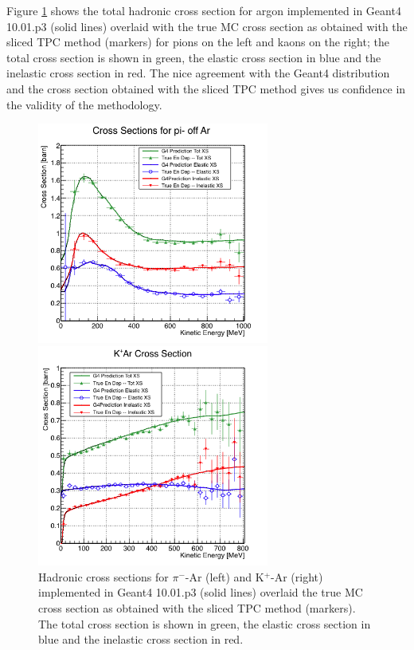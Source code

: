 Figure \ref{fig:TrueMCXS} shows the total hadronic cross section for argon implemented in Geant4 10.01.p3 (solid lines) overlaid with the true MC cross section as obtained with the sliced TPC method (markers) for pions on the left and kaons on the right; the total cross section is shown in green,  the elastic cross section in blue and the inelastic cross section in red.  The nice agreement with the Geant4 distribution and the cross section  obtained with the sliced TPC method gives us confidence in the  validity of the methodology. 
        
\begin{figure}
\begin{minipage}[b]{.53\textwidth}  
  \centering  
\includegraphics[width=3in]{Chapter-4/Images/PionTrueXS.png}
\end{minipage}%
\begin{minipage}[b]{0.53\textwidth}  
  \centering  
\includegraphics[width=3in]{Chapter-4/Images/KaonTrueXS.png}
\end{minipage}
\label{fig:TrueMCXS}
\caption{Hadronic cross sections for $\pi^-$-Ar (left) and K$^+$-Ar (right) implemented in Geant4 10.01.p3 (solid lines) overlaid the true MC cross section as obtained with the sliced TPC method (markers). The total cross section is shown in green,  the elastic cross section in blue and the inelastic cross section in red.}

\end{figure}
